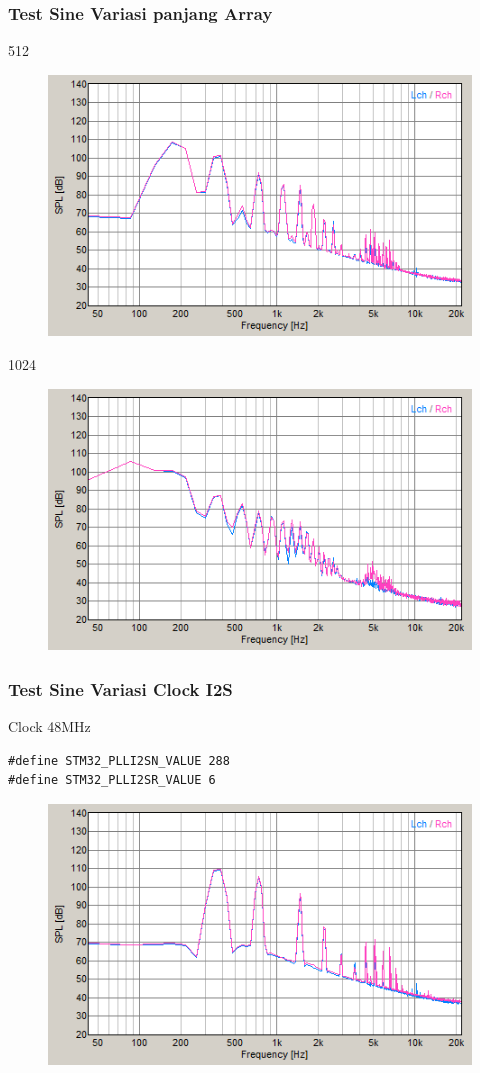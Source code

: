 \documentclass[table,dvipsnames,10pt]{beamer}
\begin{document}
	\begin{frame}[fragile]
	\frametitle{Test Sine Variasi panjang Array}
	\begin{exampleblock}{512}
		\begin{figure}[H]
			\centering
			\includegraphics[width=0.4\linewidth]{result/day_1/max512}
		\end{figure}
	\end{exampleblock}
	\begin{exampleblock}{1024}
		\begin{figure}[H]
			\centering
			\includegraphics[width=0.4\linewidth]{result/day_1/max1024}
		\end{figure}
	\end{exampleblock}
	\end{frame}

	\begin{frame}[fragile]
	\frametitle{Test Sine Variasi Clock I2S}
	\begin{exampleblock}{Clock 48MHz}
		\begin{verbatim}
#define STM32_PLLI2SN_VALUE 288
#define STM32_PLLI2SR_VALUE 6
		\end{verbatim}
	\end{exampleblock}
	\begin{exampleblock}{}
		\begin{figure}[H]
		\centering
		\includegraphics[width=0.5\linewidth]{result/day_2/sine_clk48}
	\end{figure}
	\end{exampleblock}
	\end{frame}
\end{document}

